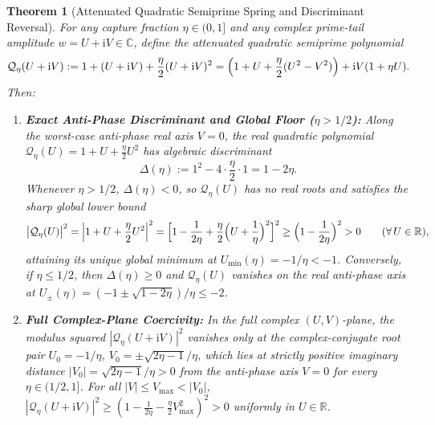 \documentclass[11pt,reqno]{amsart}
\newtheorem{theorem}{Theorem}[section]
\theoremstyle{definition}
\theoremstyle{remark}
\numberwithin{equation}{section}
\newcommand{\ii}{\mathrm{i}}
\begin{document}
\begin{theorem}[Attenuated Quadratic Semiprime Spring and Discriminant Reversal]\label{thm:attenuated-spring}
For any capture fraction $\eta \in (0,1]$ and any complex prime-tail amplitude $w = U + \ii V \in \mathbb{C}$, define the attenuated quadratic semiprime polynomial
\begin{equation}\label{eq:P-eta-def}
\mathcal{Q}_\eta(U + \ii V) := 1 + (U + \ii V) + \frac{\eta}{2}(U + \ii V)^2 = \Bigl(1 + U + \frac{\eta}{2}(U^2 - V^2)\Bigr) + \ii V(1 + \eta U).
\end{equation}
Then:
\begin{enumerate}[label=\upshape(\alph*),leftmargin=2.2em]
\item \textbf{Exact Anti-Phase Discriminant and Global Floor ($\eta > 1/2$):} Along the worst-case anti-phase real axis $V = 0$, the real quadratic polynomial $\mathcal{Q}_\eta(U) = 1 + U + \frac{\eta}{2}U^2$ has algebraic discriminant
\begin{equation}\label{eq:discriminant-eta}
\Delta(\eta) := 1^2 - 4\cdot\frac{\eta}{2}\cdot 1 = 1 - 2\eta.
\end{equation}
Whenever $\eta > 1/2$, $\Delta(\eta) < 0$, so $\mathcal{Q}_\eta(U)$ has no real roots and satisfies the sharp global lower bound
\begin{equation}\label{eq:spring-floor}
\bigl|\mathcal{Q}_\eta(U)\bigr|^2 = \Bigl|1 + U + \frac{\eta}{2}U^2\Bigr|^2 = \Bigl[1 - \frac{1}{2\eta} + \frac{\eta}{2}\Bigl(U + \frac{1}{\eta}\Bigr)^2\Bigr]^2 \ge \Bigl(1 - \frac{1}{2\eta}\Bigr)^2 > 0 \qquad (\forall\,U \in \mathbb{R}),
\end{equation}
attaining its unique global minimum at $U_{\min}(\eta) = -1/\eta < -1$. Conversely, if $\eta \le 1/2$, then $\Delta(\eta) \ge 0$ and $\mathcal{Q}_\eta(U)$ vanishes on the real anti-phase axis at $U_\pm(\eta) = (-1 \pm \sqrt{1-2\eta})/\eta \le -2$.
\item \textbf{Full Complex-Plane Coercivity:} In the full complex $(U,V)$-plane, the modulus squared $|\mathcal{Q}_\eta(U+\ii V)|^2$ vanishes only at the complex-conjugate root pair $U_0 = -1/\eta$, $V_0 = \pm \sqrt{2\eta - 1}/\eta$, which lies at strictly positive imaginary distance $|V_0| = \sqrt{2\eta - 1}/\eta > 0$ from the anti-phase axis $V=0$ for every $\eta \in (1/2, 1]$. For all $|V| \le V_{\max} < |V_0|$, $|\mathcal{Q}_\eta(U+\ii V)|^2 \ge (1 - \frac{1}{2\eta} - \frac{\eta}{2}V_{\max}^2)^2 > 0$ uniformly in $U \in \mathbb{R}$.
\end{enumerate}
\end{theorem}
\end{document}
